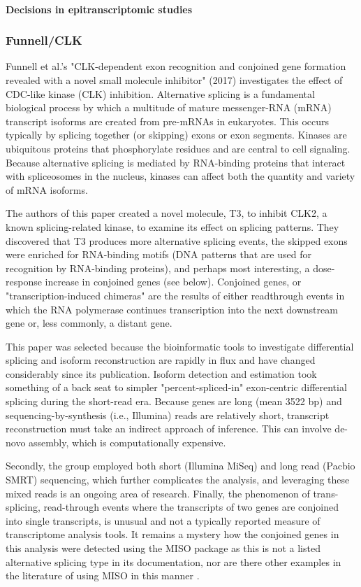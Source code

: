 \documentclass{drexelthesis}
\begin{document}
\paragraph{Decisions in epitranscriptomic studies}

\subsubsection{Funnell/CLK}

Funnell et al.'s "CLK-dependent exon recognition and conjoined gene formation revealed with a novel small molecule inhibitor" (2017) investigates the effect of CDC-like kinase (CLK) inhibition. Alternative splicing is a fundamental biological process by which a multitude of mature messenger-RNA (mRNA) transcript isoforms are created from pre-mRNAs in eukaryotes. This occurs typically by splicing together (or skipping) exons or exon segments. Kinases are ubiquitous proteins that phosphorylate residues and are central to cell signaling. Because alternative splicing is mediated by RNA-binding proteins that interact with spliceosomes in the nucleus, kinases can affect both the quantity and variety of mRNA isoforms.

The authors of this paper created a novel molecule, T3, to inhibit CLK2, a known splicing-related kinase, to examine its effect on splicing patterns. They discovered that T3 produces more alternative splicing events, the skipped exons were enriched for RNA-binding motifs (DNA patterns that are used for recognition by RNA-binding proteins), and perhaps most interesting, a dose-response increase in conjoined genes (see below). Conjoined genes, or "transcription-induced chimeras" are the results of either readthrough events in which the RNA polymerase continues transcription into the next downstream gene or, less commonly, a distant gene.

This paper was selected because the bioinformatic tools to investigate differential splicing and isoform reconstruction are rapidly in flux and have changed considerably since its publication. Isoform detection and estimation took something of a back seat to simpler "percent-spliced-in" exon-centric differential splicing during the short-read era. Because genes are long (mean 3522 bp) and sequencing-by-synthesis (i.e., Illumina) reads are relatively short, transcript reconstruction must take an indirect approach of inference. This can involve de-novo assembly, which is computationally expensive.

Secondly, the group employed both short (Illumina MiSeq) and long read (Pacbio SMRT) sequencing, which further complicates the analysis, and leveraging these mixed reads is an ongoing area of research. Finally, the phenomenon of trans-splicing, read-through events where the transcripts of two genes are conjoined into single transcripts, is unusual and not a typically reported measure of transcriptome analysis tools. It remains a mystery how the conjoined genes in this analysis were detected using the MISO package as this is not a listed alternative splicing type in its documentation, nor are there other examples in the literature of using MISO in this manner \cite{Katz2010-ts}.
\end{document}
